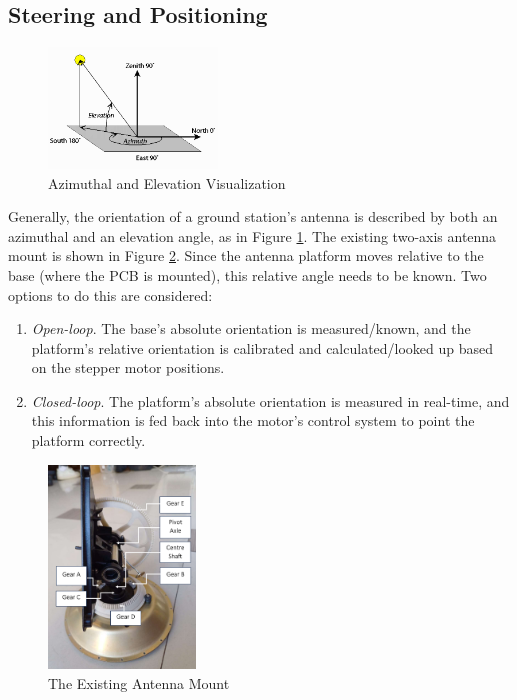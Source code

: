 \subsection{Steering and Positioning}\label{sec:gs_steering_positioning}
\begin{figure}[!htb]
    \centering
    \includegraphics[width=0.4\textwidth]{az_elevation}
    \caption{Azimuthal and Elevation Visualization \cite{site-azElevationVisual}}
    \label{fig:az_elevation}
\end{figure}

Generally, the orientation of a ground station's antenna is described by both an azimuthal and an elevation angle, as in Figure \ref{fig:az_elevation}. The existing two-axis antenna mount is shown in Figure \ref{fig:antennaMount}. Since the antenna platform moves relative to the base (where the PCB is mounted), this relative angle needs to be known. Two options to do this are considered:
\begin{enumerate}
    \item \textit{Open-loop}. The base's absolute orientation is measured/known, and the platform's relative orientation is calibrated and calculated/looked up based on the stepper motor positions.
    \item \textit{Closed-loop}. The platform's absolute orientation is measured in real-time, and this information is fed back into the motor's control system to point the platform correctly.
\end{enumerate}

\begin{figure}[!htb]
    \centering
    \includegraphics[width=0.35\textwidth]{antennaMount}
    \caption{The Existing Antenna Mount}
    \label{fig:antennaMount}
\end{figure}

